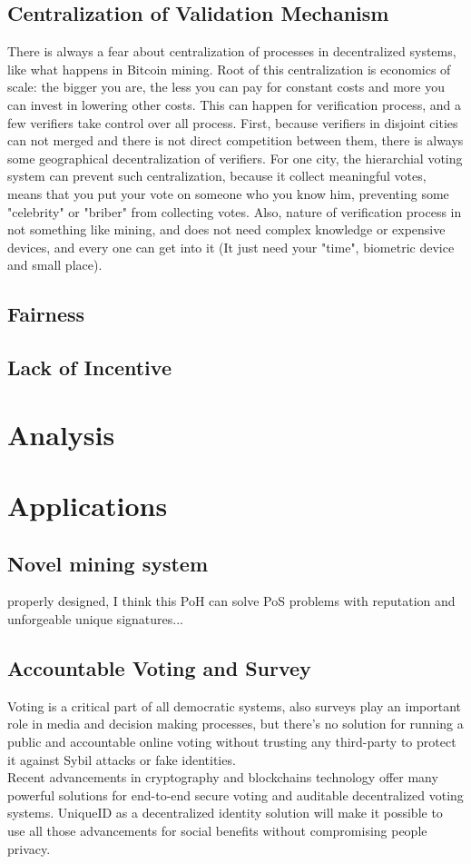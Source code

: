\documentclass{article}
\begin{document}
\subsection{Centralization of Validation Mechanism}
There is always a fear about centralization of processes in decentralized systems, like what happens in Bitcoin mining. Root of this centralization is economics of scale: the bigger you are, the less you can pay for constant costs and more you can invest in lowering other costs. This can happen for verification process, and a few verifiers take control over all process. First, because verifiers in disjoint cities can not merged and there is not direct competition between them, there is always some geographical decentralization of verifiers. For one city, the hierarchial voting system can prevent such centralization, because it collect meaningful votes, means that you put your vote on someone who you know him, preventing some "celebrity" or "briber" from collecting votes. Also, nature of verification process in not something like mining, and does not need complex knowledge or expensive devices, and every one can get into it (It just need your "time", biometric device and small place). 

\subsection{Fairness}
\subsection{Lack of Incentive}


\section{Analysis}

 
\section{Applications}

\subsection{Novel mining system}
properly designed, I think this PoH can solve PoS problems with reputation and unforgeable unique signatures...

\subsection{Accountable Voting and Survey}
Voting is a critical part of all democratic systems, also surveys play an important role in media and decision making processes, but there's no solution for running a public and accountable online voting without trusting any third-party to protect it against Sybil attacks or fake identities.\\
Recent advancements in cryptography and blockchains technology offer many powerful solutions for end-to-end secure voting and auditable decentralized voting systems. UniqueID as a decentralized identity solution will make it possible to use all those advancements for social benefits without compromising people privacy.
\end{document}

